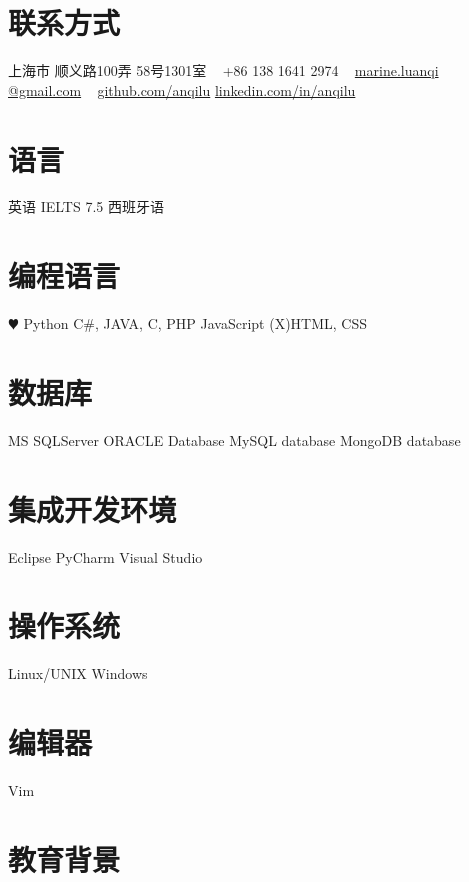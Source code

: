 \documentclass[]{friggeri-cv-cn} %
\begin{document}


\begin{aside} %
\section{联系方式}
上海市
顺义路100弄
58号1301室
~
+86 138 1641 2974
~
\href{mailto:marie.luanqi@gmail.com}{marine.luanqi\\@gmail.com}
~
\href{https://github.com/anqilu}{github.com/anqilu}
\href{https://www.linkedin.com/in/anqilu}{linkedin.com/in/anqilu}
\section{语言}
英语 IELTS 7.5
西班牙语
\section{编程语言}
{\color{red} $\varheartsuit$} Python
C\#, JAVA, C, PHP
JavaScript
(X)HTML, CSS
\section{数据库}
MS SQLServer
ORACLE Database 
MySQL database
MongoDB database
\section{集成开发环境}
Eclipse
PyCharm
Visual Studio
\section{操作系统}
Linux/UNIX
Windows
\section{编辑器}
Vim
\end{aside}

\section{教育背景}
\end{document}
